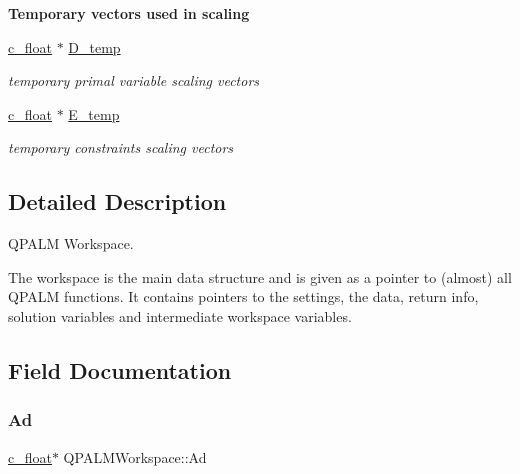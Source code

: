 \begin{Indent}\textbf{ Temporary vectors used in scaling}\par
\begin{DoxyCompactItemize}
\item 
\mbox{\hyperlink{global__opts_8h_a7f1a9fda95e52979658c20a0d134fb15}{c\+\_\+float}} $\ast$ \mbox{\hyperlink{structQPALMWorkspace_a2bc2197cd4f371383a791f58b11af6d2}{D\+\_\+temp}}
\begin{DoxyCompactList}\small\item\em temporary primal variable scaling vectors \end{DoxyCompactList}\item 
\mbox{\hyperlink{global__opts_8h_a7f1a9fda95e52979658c20a0d134fb15}{c\+\_\+float}} $\ast$ \mbox{\hyperlink{structQPALMWorkspace_ac7d0355a7c31ec062df981ff4b8199f8}{E\+\_\+temp}}
\begin{DoxyCompactList}\small\item\em temporary constraints scaling vectors \end{DoxyCompactList}\end{DoxyCompactItemize}
\end{Indent}


\subsection{Detailed Description}
Q\+P\+A\+LM Workspace. 

The workspace is the main data structure and is given as a pointer to (almost) all Q\+P\+A\+LM functions. It contains pointers to the settings, the data, return info, solution variables and intermediate workspace variables. 

\subsection{Field Documentation}
\mbox{\label{structQPALMWorkspace_ae40218985461185bbab01576ed8a1ca5}} 
\subsubsection{\texorpdfstring{Ad}{Ad}}
{\footnotesize\ttfamily \mbox{\hyperlink{global__opts_8h_a7f1a9fda95e52979658c20a0d134fb15}{c\+\_\+float}}$\ast$ Q\+P\+A\+L\+M\+Workspace\+::\+Ad}



